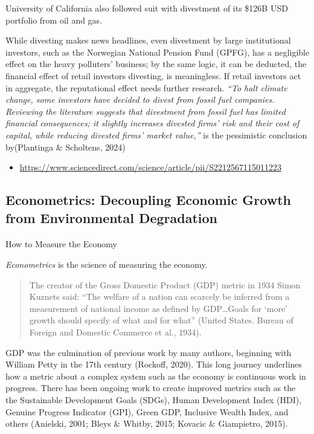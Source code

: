 \documentclass[
  letterpaper,
  DIV=11,
  numbers=noendperiod]{scrartcl}
\makeatletter
\let\oldparagraph\paragraph
\renewcommand{\paragraph}{
    \@ifstar
      \xxxParagraphStar
      \xxxParagraphNoStar
  }
\newcommand{\xxxParagraphStar}[1]{\oldparagraph*{#1}\mbox{}}
\newcommand{\xxxParagraphNoStar}[1]{\oldparagraph{#1}\mbox{}}
\providecommand{\tightlist}{%
  \setlength{\itemsep}{0pt}\setlength{\parskip}{0pt}}\usepackage{longtable,booktabs,array}
\makeatother
\begin{document}
University of California also followed suit with divestment of its
\$126B USD portfolio from oil and gas.

While divesting makes news headlines, even divestment by large
institutional investors, such as the Norwegian National Pension Fund
(GPFG), has a negligible effect on the heavy polluters' business; by the
same logic, it can be deducted, the financial effect of retail investors
divesting, is meaningless. If retail investors act in aggregate, the
reputational effect needs further research. \emph{``To halt climate
change, some investors have decided to divest from fossil fuel
companies. Reviewing the literature suggests that divestment from fossil
fuel has limited financial consequences; it slightly increases divested
firms' risk and their cost of capital, while reducing divested firms'
market value,''} is the pessimistic conclusion by(Plantinga \&
Scholtens, 2024)

\begin{itemize}
\tightlist
\item
  \url{https://www.sciencedirect.com/science/article/pii/S2212567115011223}
\end{itemize}

\subsection{Econometrics: Decoupling Economic Growth from Environmental
Degradation}\label{econometrics-decoupling-economic-growth-from-environmental-degradation}

\paragraph{How to Measure the Economy}\label{how-to-measure-the-economy}

\emph{Econometrics} is the science of measuring the economy.

\begin{quote}
The creator of the Gross Domestic Product (GDP) metric in 1934 Simon
Kuznets said: ``The welfare of a nation can scarcely be inferred from a
measurement of national income as defined by GDP\ldots Goals for `more'
growth should specify of what and for what'' (United States. Bureau of
Foreign and Domestic Commerce et al., 1934).
\end{quote}

GDP was the culmination of previous work by many authors, beginning with
William Petty in the 17th century (Rockoff, 2020). This long journey
underlines how a metric about a complex system such as the economy is
continuous work in progress. There has been ongoing work to create
improved metrics such as the the Sustainable Development Goals (SDGs),
Human Development Index (HDI), Genuine Progress Indicator (GPI), Green
GDP, Inclusive Wealth Index, and others (Anielski, 2001; Bleys \&
Whitby, 2015; Kovacic \& Giampietro, 2015).
\end{document}
